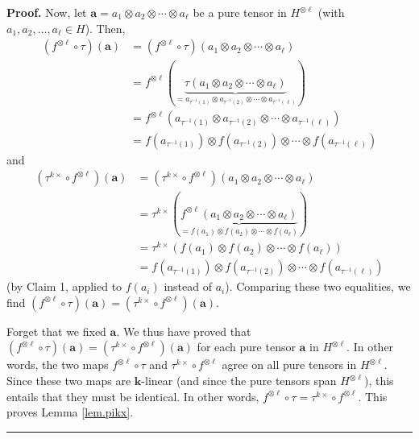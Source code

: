\documentclass[numbers=enddot,12pt,final,onecolumn,notitlepage]{scrartcl}%
\theoremstyle{definition}
\newenvironment{proof}[1][Proof]{\noindent\textbf{#1.} }{\ \rule{0.5em}{0.5em}}
\begin{document}
\begin{proof}
Now, let $\mathbf{a}=a_{1}\otimes a_{2}\otimes\cdots\otimes a_{\ell}$ be a
pure tensor in $H^{\otimes\ell}$ (with $a_{1},a_{2},\ldots,a_{\ell}\in H$).
Then,%
\begin{align*}
\left(  f^{\otimes\ell}\circ\tau\right)  \left(  \mathbf{a}\right)   &
=\left(  f^{\otimes\ell}\circ\tau\right)  \left(  a_{1}\otimes a_{2}%
\otimes\cdots\otimes a_{\ell}\right) \\
&  =f^{\otimes\ell}\left(  \underbrace{\tau\left(  a_{1}\otimes a_{2}%
\otimes\cdots\otimes a_{\ell}\right)  }_{=a_{\tau^{-1}\left(  1\right)
}\otimes a_{\tau^{-1}\left(  2\right)  }\otimes\cdots\otimes a_{\tau
^{-1}\left(  \ell\right)  }}\right) \\
&  =f^{\otimes\ell}\left(  a_{\tau^{-1}\left(  1\right)  }\otimes a_{\tau
^{-1}\left(  2\right)  }\otimes\cdots\otimes a_{\tau^{-1}\left(  \ell\right)
}\right) \\
&  =f\left(  a_{\tau^{-1}\left(  1\right)  }\right)  \otimes f\left(
a_{\tau^{-1}\left(  2\right)  }\right)  \otimes\cdots\otimes f\left(
a_{\tau^{-1}\left(  \ell\right)  }\right)
\end{align*}
and%
\begin{align*}
\left(  \tau^{k\times}\circ f^{\otimes\ell}\right)  \left(  \mathbf{a}\right)
&  =\left(  \tau^{k\times}\circ f^{\otimes\ell}\right)  \left(  a_{1}\otimes
a_{2}\otimes\cdots\otimes a_{\ell}\right) \\
&  =\tau^{k\times}\left(  \underbrace{f^{\otimes\ell}\left(  a_{1}\otimes
a_{2}\otimes\cdots\otimes a_{\ell}\right)  }_{=f\left(  a_{1}\right)  \otimes
f\left(  a_{2}\right)  \otimes\cdots\otimes f\left(  a_{\ell}\right)  }\right)
\\
&  =\tau^{k\times}\left(  f\left(  a_{1}\right)  \otimes f\left(
a_{2}\right)  \otimes\cdots\otimes f\left(  a_{\ell}\right)  \right) \\
&  =f\left(  a_{\tau^{-1}\left(  1\right)  }\right)  \otimes f\left(
a_{\tau^{-1}\left(  2\right)  }\right)  \otimes\cdots\otimes f\left(
a_{\tau^{-1}\left(  \ell\right)  }\right)
\end{align*}
(by Claim 1, applied to $f\left(  a_{i}\right)  $ instead of $a_{i}$).
Comparing these two equalities, we find $\left(  f^{\otimes\ell}\circ
\tau\right)  \left(  \mathbf{a}\right)  =\left(  \tau^{k\times}\circ
f^{\otimes\ell}\right)  \left(  \mathbf{a}\right)  $.

Forget that we fixed $\mathbf{a}$. We thus have proved that $\left(
f^{\otimes\ell}\circ\tau\right)  \left(  \mathbf{a}\right)  =\left(
\tau^{k\times}\circ f^{\otimes\ell}\right)  \left(  \mathbf{a}\right)  $ for
each pure tensor $\mathbf{a}$ in $H^{\otimes\ell}$. In other words, the two
maps $f^{\otimes\ell}\circ\tau$ and $\tau^{k\times}\circ f^{\otimes\ell}$
agree on all pure tensors in $H^{\otimes\ell}$. Since these two maps are
$\mathbf{k}$-linear (and since the pure tensors span $H^{\otimes\ell}$), this
entails that they must be identical. In other words, $f^{\otimes\ell}\circ
\tau=\tau^{k\times}\circ f^{\otimes\ell}$. This proves Lemma \ref{lem.pikx}.
\end{proof}
\end{document}
